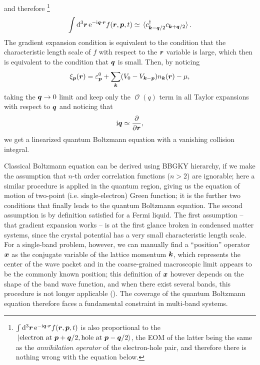 \documentclass[hyperref, a4paper]{article}
\newcommand*{\ii}{\mathrm{i}}
\newcommand*{\ee}{\mathrm{e}}
\DeclareMathOperator{\bigO}{\mathcal{O}}
\begin{document}
and therefore%
\footnote{
    $\int \dd[3]{\vb*{r}} \ee^{- \ii \vb*{q} \cdot \vb*{r}} f(\vb*{r}, \vb*{p}, t)$ 
    is also proportional to the 
    $\ket*{\text{electron at $\vb*{p} + \vb*{q} / 2$}, \text{hole at $\vb*{p} - \vb*{q} / 2$}}$,
    the EOM of the latter being the same as 
    the \emph{annihilation operator} of the electron-hole pair,
    and therefore there is nothing wrong with the equation below.
}
\begin{equation}
    \int \dd[3]{\vb*{r}} \ee^{- \ii \vb*{q} \cdot \vb*{r}} f(\vb*{r}, \vb*{p}, t)
    \simeq \expval*{c^\dagger_{\vb*{k} - \vb*{q} / 2} c_{\vb*{k} + \vb*{q} / 2}} .
\end{equation}
The gradient expansion condition is equivalent to the condition that 
the characteristic length scale of $f$ with respect to the $\vb*{r}$ variable is large,
which then is equivalent to the condition that $\vb*{q}$ is small.
Then, by noticing 
\begin{equation}
    \xi_{\vb*{p}}(\vb*{r}) = \varepsilon^0_{\vb*{p}}
    + \sum_{\vb*{k}} (V_{0} - V_{\vb*{k} - \vb*{p}} ) n_{\vb*{k}}(\vb*{r}) - \mu,
    \label{eq:simple-fermi-liquid-xi}
\end{equation}
taking the $\vb*{q} \to 0$ limit and keep only the $\bigO(q)$ term in all Taylor expansions 
with respect to $\vb*{q}$
and noticing that 
\[
    \ii \vb*{q} \simeq \pdv{\vb*{r}},
\]
we get a linearized quantum Boltzmann equation with a vanishing collision integral.

Classical Boltzmann equation can be derived using 
BBGKY hierarchy,
if we make the assumption that $n$-th order correlation functions ($n > 2$) 
are ignorable; 
here a similar procedure is applied in the quantum region, 
giving us the equation of motion 
of two-point (i.e. single-electron) Green function;
it is the further two conditions that
finally leads to the quantum Boltzmann equation.
The second assumption is by definition satisfied for a Fermi liquid.
The first assumption -- that gradient expansion works -- is at the first glance 
broken in condensed matter systems, 
since the crystal potential has a very small characteristic length scale.
For a single-band problem, however, 
we can manually find a ``position'' operator $\vb*{x}$ as the conjugate variable 
of the lattice momentum $\vb*{k}$,
which represents the center of the wave packet 
and in the coarse-grained macroscopic limit 
appears to be the commonly known position;
this definition of $\vb*{x}$ however depends on the 
shape of the band wave function,
and when there exist several bands, 
this procedure is not longer applicable
().
The coverage of the quantum Boltzmann equation therefore 
faces a fundamental constraint in multi-band systems.
\end{document}
